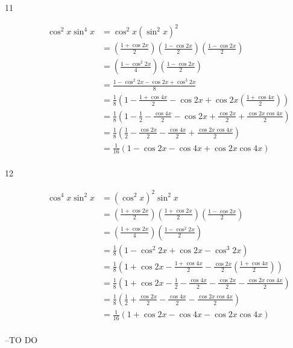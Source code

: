 \documentclass{exam}
\begin{document}
\begin{description}
      \item[11]
        \begin{align*}
          \cos^2 x \sin^4 x & = \cos^2 x \left( \sin^2 x \right)^2 \\
                            & = \left( \frac{1 + \cos 2x}{2} \right) \left( \frac{1 - \cos 2x}{2} \right) \left( \frac{1 - \cos 2x}{2} \right) \\
                            & = \left( \frac{1 - \cos^2 2x}{4} \right) \left( \frac{1 - \cos 2x}{2} \right) \\
                            & = \frac{1 - \cos^2 2x - \cos 2x + \cos^3 2x}{8} \\
                            & = \frac{1}{8} \left( 1 - \frac{1 + \cos 4x}{2} - \cos 2x + \cos 2x \left( \frac{1 + \cos 4x}{2} \right) \right) \\
                            & = \frac{1}{8} \left( 1 - \frac{1}{2} - \frac{\cos 4x}{2} - \cos 2x + \frac{\cos 2x}{2} + \frac{\cos 2x \cos 4x}{2} \right) \\
                            & = \frac{1}{8} \left( \frac{1}{2} - \frac{\cos 2x}{2} - \frac{\cos 4x}{2} + \frac{\cos 2x \cos 4x}{2} \right) \\
                            & = \frac{1}{16} ( 1 - \cos 2x - \cos 4x + \cos 2x \cos 4x ) \\
        \end{align*}

      \item[12]
        \begin{align*}
          \cos^4 x \sin^2 x & = \left( \cos^2 x \right)^2 \sin^2 x \\
                            & = \left( \frac{1 + \cos 2x}{2} \right) \left( \frac{1 + \cos 2x}{2} \right) \left( \frac{1 - \cos 2x}{2} \right) \\
                            & = \left( \frac{1 + \cos 2x}{4} \right) \left( \frac{1 - \cos^2 2x}{2} \right) \\
                            & = \frac{1}{8} \left( 1 - \cos^2 2x + \cos 2x - \cos^3 2x \right) \\
                            & = \frac{1}{8} \left( 1 + \cos 2x - \frac{1 + \cos 4x}{2}  - \frac{\cos 2x}{2} \left( \frac{1 + \cos 4x}{2} \right) \right) \\
                            & = \frac{1}{8} \left( 1 + \cos 2x - \frac{1}{2}  - \frac{\cos 4x}{2} - \frac{\cos 2x}{2} - \frac{\cos 2x \cos 4x}{2} \right) \\
                            & = \frac{1}{8} \left( \frac{1}{2} + \frac{\cos 2x}{2} - \frac{\cos 4x}{2}  - \frac{\cos 2x \cos 4x}{2} \right) \\
                            & = \frac{1}{16} \left( 1 + \cos 2x - \cos 4x  - \cos 2x \cos 4x \right) \\
        \end{align*}

    \end{description}

  \else
    \vspace{5 cm}

    \begin{quote}
      \begin{em}
      \end{em}
    \end{quote}
    \hspace{1 cm} --TO DO
  \fi
\end{document}
